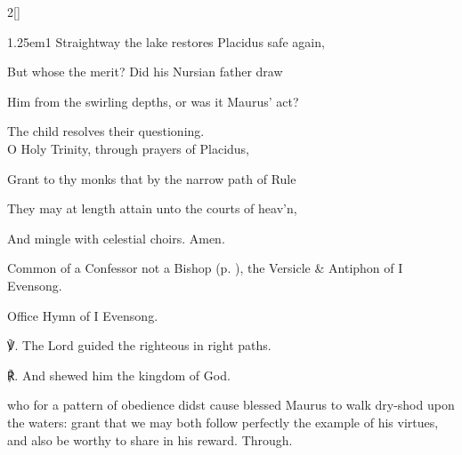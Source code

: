 \begin{paracol}{2}[]
\begin{hangparas}{1.25em}{1}
Straightway the lake restores Placidus safe again,

But whose the merit? Did his Nursian father draw

Him from the swirling depths, or was it Maurus' act?

The child resolves their questioning.\\

O Holy Trinity, through prayers of Placidus,

Grant to thy monks that by the narrow path of Rule

They may at length attain unto the courts of heav'n,

And mingle with celestial choirs. Amen.\\
\end{hangparas}

\mattinsOfficeHymn

\begin{rubric}
	Common of a Confessor not a Bishop (p. \pageref{CommonConfessorNotBishop}), the Versicle \& Antiphon of I Evensong.
\end{rubric}

\secondEvensong


\secondEvensongHymn

\begin{rubric}
	Office Hymn of I Evensong.
\end{rubric}

℣. The Lord guided the righteous in right paths.

℟. And shewed him the kingdom of God.


\fussy
\end{paracol}

\collect
{} who for a pattern of obedience didst cause blessed Maurus to walk dry-shod upon the waters: grant that we may both follow perfectly the example of his virtues, and also be worthy to share in his reward. Through.



